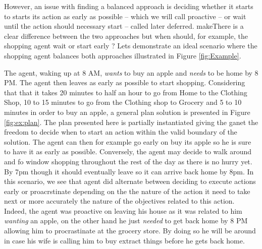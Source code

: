 However, an issue with finding a balanced approach is deciding whether
it starts to starts its action as early as possible -- which we will
call proactive 
-- or wait until the action should necessary start --
called later deferred. 
makeThere is a clear difference between the two approaches
 but when should, for example, the shopping agent wait
or start early ? Lets demonstrate an ideal scenario where the shopping
agent balances both approaches illustrated in Figure \ref{fig:Example}. 

The agent, waking up at 8 AM, {\em wants} to buy an apple
and {\em needs} to be home by 8 PM. The agent then leaves as early as
possible to start shopping. Considering that that it takes 20 minutes
to half an hour to go from Home to the Clothing Shop, 10 to 15 minutes
to go from the Clothing shop to Grocery and 5 to 10 minutes in order
to buy an apple, a general plan solution is presented in  Figure
\ref{fig:ex:plan}. The plan presented here is partially instantiated
giving the ganet the freedom to decide when to start an action within
the valid boundary of the solution. The agent can then for example go
early on buy its apple so he is sure to have it as early as possible. Conversely,
the agent may decide to walk around and fo window shopping throughout
the rest of the day as there is no hurry yet. By 7pm though it should
eventually leave so it can arrive back home by 8pm. In this scenario,
we see that agent did alternate between deciding to execute actions
early or proacrstinate depending on the the nature of the action it
need to take next or more accurately the nature of the objectives 
related to this action. Indeed, the agent was proactive on leaving his 
house as it was related to him {\em
  wanting}  an apple, on the other hand he just {\em needed} to get
back home by 8 PM allowing him to procrastinate at the grocery 
store. By doing so he will be around in case his wife is calling him
to buy extract things before he gets back home. 


